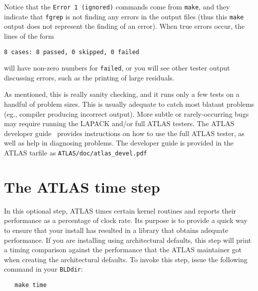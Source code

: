 \documentclass[11pt]{article}
\begin{document}
Notice that the {\tt Error 1 (ignored)} commands come from {\tt make}, and they
indicate that {\tt fgrep} is not finding any errors in the output files
(thus this {\tt make} output does not represent the finding of an error).
When true errors occur, the lines of the form
\vspace*{-0.1in}
\begin{verbatim}
8 cases: 8 passed, 0 skipped, 0 failed
\end{verbatim}

will have non-zero numbers for {\tt failed}, or you will see other tester
output discussing errors, such as the printing of large residuals.

As mentioned, this is really sanity checking, and it runs only a few tests
on a handful of problem sizes.  This is usually adequate to catch most
blatant problems (eg., compiler producing incorrect output).  More subtle
or rarely-occurring bugs may require running the LAPACK and/or full ATLAS
testers.  The ATLAS developer guide~\cite{atlas-devel} provides instructions
on how to use the full ATLAS tester, as well as help in diagnosing problems.
The developer guide is provided in the ATLAS tarfile as
{\tt ATLAS/doc/atlas\_devel.pdf}

\section{The ATLAS time step}
\label{sec-time}
In this optional step, ATLAS times certain kernel routines and reports their
performance as a percentage of clock rate.  Its purpose is to provide a
quick way to ensure that your install has resulted in a library that obtains
adequate performance.  If you are installing using architectural
defaults, this step will print a timing comparison against the performance
that the ATLAS maintainer got when creating the architectural defaults.
To invoke this step, issue the following command in your {\tt BLDdir}:
\vspace*{-0.1in}
\begin{verbatim}
   make time
\end{verbatim}
\end{document}
